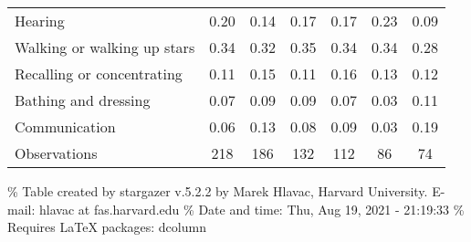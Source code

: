\documentclass[
]{article}
\begin{document}
\begin{table}
\begin{tabular}[t]{lcccccc}
\hspace{1em}Hearing & 0.20 & 0.14 & 0.17 & 0.17 & 0.23 & 0.09\\
\hspace{1em}Walking or walking up stars & 0.34 & 0.32 & 0.35 & 0.34 & 0.34 & 0.28\\
\hspace{1em}Recalling or concentrating & 0.11 & 0.15 & 0.11 & 0.16 & 0.13 & 0.12\\
\hspace{1em}Bathing and dressing & 0.07 & 0.09 & 0.09 & 0.07 & 0.03 & 0.11\\
\hspace{1em}Communication & 0.06 & 0.13 & 0.08 & 0.09 & 0.03 & 0.19\\
Observations & 218 & 186 & 132 & 112 & 86 & 74\\
\bottomrule
\end{tabular}
\end{table}

\% Table created by stargazer v.5.2.2 by Marek Hlavac, Harvard
University. E-mail: hlavac at fas.harvard.edu \% Date and time: Thu, Aug
19, 2021 - 21:19:33 \% Requires LaTeX packages: dcolumn
\end{document}
